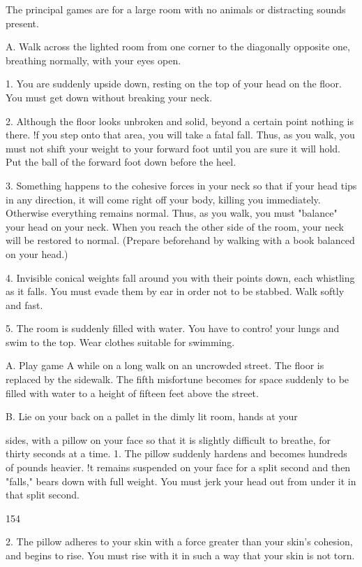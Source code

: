 \documentclass[10pt,twoside]{memoir}
\begin{document}
\begin{enumerate}
{\begin{enumerate}
\begin{sysrules}
\begin{sysrules}
\begin{sysrules}
\begin{sysrules}
The principal games are for a large room with no animals or distracting 
sounds present. 

A. Walk across the lighted room from one corner to the diagonally 
opposite one, breathing normally, with your eyes open. 

1. You are suddenly upside down, resting on the top of your head on the 
floor. You must get down without breaking your neck. 

2. Although the floor looks unbroken and solid, beyond a certain point 
nothing is there. !f you step onto that area, you will take a fatal fall. Thus, as 
you walk, you must not shift your weight to your forward foot until you are 
sure it will hold. Put the ball of the forward foot down before the heel. 

3. Something happens to the cohesive forces in your neck so that if your 
head tips in any direction, it will come right off your body, killing you 
immediately. Otherwise everything remains normal. Thus, as you walk, you 
must "balance" your head on your neck. When you reach the other side of 
the room, your neck will be restored to normal. (Prepare beforehand by 
walking with a book balanced on your head.) 

4. Invisible conical weights fall around you with their points down, each 
whistling as it falls. You must evade them by ear in order not to be stabbed. 
Walk softly and fast. 

5. The room is suddenly filled with water. You have to contro! your lungs 
and swim to the top. Wear clothes suitable for swimming. 

A. Play game A while on a long walk on an uncrowded street. The floor 
is replaced by the sidewalk. The fifth misfortune becomes for space suddenly 
to be filled with water to a height of fifteen feet above the street. 

B. Lie on your back on a pallet in the dimly lit room, hands at your 

sides, with a pillow on your face so that it is slightly difficult to breathe, for 
thirty seconds at a time. 
1. The pillow suddenly hardens and becomes hundreds of pounds heavier. !t 
remains suspended on your face for a split second and then "falls," bears 
down with full weight. You must jerk your head out from under it in that 
split second. 


154 


2. The pillow adheres to your skin with a force greater than your skin's 
cohesion, and begins to rise. You must rise with it in such a way that your 
skin is not torn. 


\end{sysrules}
\end{sysrules}
\end{sysrules}
\end{sysrules}
\end{enumerate}}
\end{enumerate}
\end{document}

